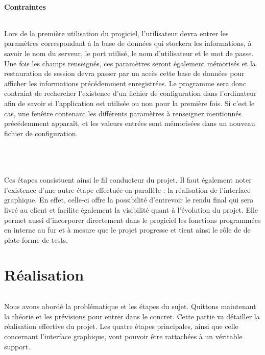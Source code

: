 \documentclass[a4paper,10pt]{report}
\begin{document}
      \subsection{Contraintes}
	\paragraph{}
	  Lors de la première utilisation du progiciel, l'utilisateur devra entrer les paramètres correspondant à la base de données qui stockera les informations, à savoir le nom du serveur, le port utilisé, le nom d'utilisateur et le mot de passe.
	  Une fois les champs renseignés, ces paramètres seront également mémorisés et la restauration de session devra passer par un accès cette base de données pour afficher les informations précédemment enregistrées.
	  Le programme sera donc contraint de rechercher l'existence d'un fichier de configuration dans l'ordinateur afin de savoir si l'application est utilisée ou non pour la première fois.
	  Si c'est le cas, une fenêtre contenant les différents paramètres à renseigner mentionnés précédemment apparaît, et les valeurs entrées sont mémorisées dans un nouveau fichier de configuration.
	  ~\\
	  ~\\
	  ~\\
	\paragraph{}
	  Ces étapes consistuent ainsi le fil conducteur du projet. 
	  Il faut également noter l'existence d'une autre étape effectuée en parallèle : la réalisation de l'interface graphique.
	  En effet, celle-ci offre la possibilité d'entrevoir le rendu final qui sera livré au client et facilite également la visibilité quant à l'évolution du projet.
	  Elle permet aussi d'incorporer directement dans le progiciel les fonctions programmées en interne au fur et à mesure que le projet progresse et tient ainsi le rôle de de plate-forme de tests.   
	
\part{Réalisation}
  \setcounter{chapter}{0}
  
	\paragraph{}
	  Nous avons abordé la problématique et les étapes du sujet.
	  Quittons maintenant la théorie et les prévisions pour entrer dans le concret.
	  Cette partie va détailler la réalisation effective du projet.
	  Les quatre étapes principales, ainsi que celle concernant l'interface graphique, vont pouvoir être rattachées à un véritable support.
	  
\end{document}
